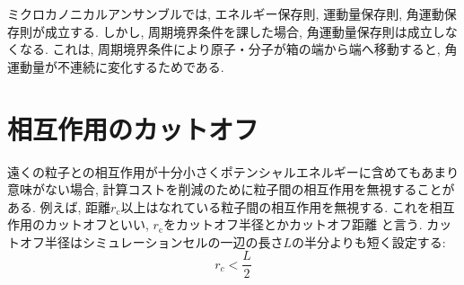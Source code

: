 ミクロカノニカルアンサンブルでは, エネルギー保存則, 運動量保存則, 角運動保存則が成立する.
しかし, 周期境界条件を課した場合, 角運動量保存則は成立しなくなる.
これは, 周期境界条件により原子・分子が箱の端から端へ移動すると, 角運動量が不連続に変化するためである. 

\section{相互作用のカットオフ}
遠くの粒子との相互作用が十分小さくポテンシャルエネルギーに含めてもあまり意味がない場合,
計算コストを削減のために粒子間の相互作用を無視することがある.
例えば, 距離$r_{\mathrm{c}}$以上はなれている粒子間の相互作用を無視する.
これを相互作用のカットオフといい, $r_{\mathrm{c}}$をカットオフ半径とかカットオフ距離
と言う. カットオフ半径はシミュレーションセルの一辺の長さ$L$の半分よりも短く設定する:
\begin{equation}
 r_{c} < \frac{L}{2}
\end{equation}

